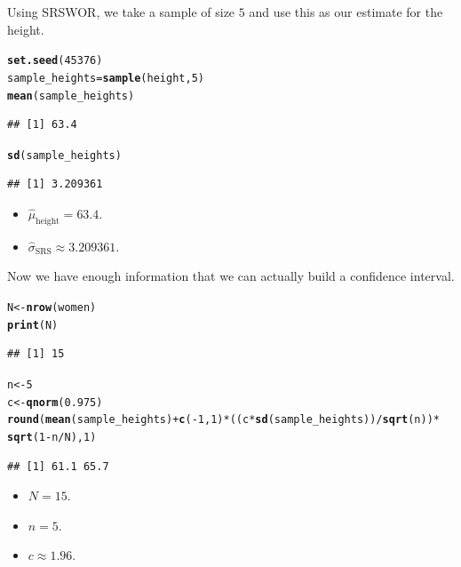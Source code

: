 \documentclass[oneside]{book}\usepackage[]{graphicx}\usepackage[dvipsnames,table,xcdraw]{xcolor}
\makeatletter
\newcommand{\hlnum}[1]{\textcolor[rgb]{0.686,0.059,0.569}{#1}}%
\newcommand{\hlopt}[1]{\textcolor[rgb]{0,0,0}{#1}}%
\newcommand{\hlstd}[1]{\textcolor[rgb]{0.345,0.345,0.345}{#1}}%
\newcommand{\hlkwb}[1]{\textcolor[rgb]{0.69,0.353,0.396}{#1}}%
\newcommand{\hlkwd}[1]{\textcolor[rgb]{0.737,0.353,0.396}{\textbf{#1}}}%
\newenvironment{kframe}{%
 \def\at@end@of@kframe{}%
 \ifinner\ifhmode%
  \def\at@end@of@kframe{\end{minipage}}%
  \begin{minipage}{\columnwidth}%
 \fi\fi%
 \def\FrameCommand##1{\hskip\@totalleftmargin \hskip-\fboxsep
 \colorbox{shadecolor}{##1}\hskip-\fboxsep
     \hskip-\linewidth \hskip-\@totalleftmargin \hskip\columnwidth}%
 \MakeFramed {\advance\hsize-\width
   \@totalleftmargin\z@ \linewidth\hsize
   \@setminipage}}%
 {\par\unskip\endMakeFramed%
 \at@end@of@kframe}
\newenvironment{knitrout}{}{} %
\makeatother
\begin{document}
Using SRSWOR, we take a sample of size $5$ and use this as our estimate for the height.

\begin{knitrout}
\color{fgcolor}\begin{kframe}
\begin{alltt}
\hlkwd{set.seed}\hlstd{(}\hlnum{45376}\hlstd{)}
\hlstd{sample_heights} \hlkwb{=} \hlkwd{sample}\hlstd{(height,} \hlnum{5}\hlstd{)}
\hlkwd{mean}\hlstd{(sample_heights)}
\end{alltt}
\begin{verbatim}
## [1] 63.4
\end{verbatim}
\begin{alltt}
\hlkwd{sd}\hlstd{(sample_heights)}
\end{alltt}
\begin{verbatim}
## [1] 3.209361
\end{verbatim}
\end{kframe}
\end{knitrout}
\begin{itemize}
    \item $\hat{\mu}_{\text{height}}=63.4$.
    \item $\hat{\sigma}_{\text{SRS}}\approx 3.209361$.
\end{itemize}

Now we have enough information that we can actually build a confidence interval.

\begin{knitrout}
\color{fgcolor}\begin{kframe}
\begin{alltt}
\hlstd{N} \hlkwb{<-} \hlkwd{nrow}\hlstd{(women)}
\hlkwd{print}\hlstd{(N)}
\end{alltt}
\begin{verbatim}
## [1] 15
\end{verbatim}
\begin{alltt}
\hlstd{n} \hlkwb{<-} \hlnum{5}
\hlstd{c} \hlkwb{<-} \hlkwd{qnorm}\hlstd{(}\hlnum{0.975}\hlstd{)}
\hlkwd{round}\hlstd{(}\hlkwd{mean}\hlstd{(sample_heights)} \hlopt{+} \hlkwd{c}\hlstd{(}\hlopt{-}\hlnum{1}\hlstd{,} \hlnum{1}\hlstd{)} \hlopt{*} \hlstd{((c} \hlopt{*} \hlkwd{sd}\hlstd{(sample_heights))}\hlopt{/}\hlkwd{sqrt}\hlstd{(n))} \hlopt{*}
  \hlkwd{sqrt}\hlstd{(}\hlnum{1} \hlopt{-} \hlstd{n}\hlopt{/}\hlstd{N),} \hlnum{1}\hlstd{)}
\end{alltt}
\begin{verbatim}
## [1] 61.1 65.7
\end{verbatim}
\end{kframe}
\end{knitrout}
\begin{itemize}
    \item $N=15$.
    \item $n=5$.
    \item $c\approx 1.96$.
\end{itemize}
\end{document}
